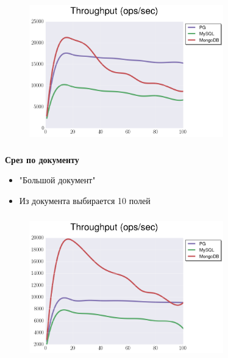 \documentclass[usenames,dvipsnames, 18pt, compress, aspectratio=169]{beamer}
\begin{document}
\begin{frame}
    \frametitle{}
    \begin{center}
    \begin{figure}
        \includegraphics[width=0.75\textwidth,center]{benchmarks/select_slice_1_btree_throughput.png}
    \end{figure}
    \end{center}
\end{frame}

\begin{frame}
    \frametitle{}
    \begin{center}
        \textbf{Срез по документу}
        \begin{itemize}[label={}]
            \item "Большой документ"
            \item Из документа выбирается 10 полей
        \end{itemize}
    \end{center}
\end{frame}

\begin{frame}
    \frametitle{}
    \begin{center}
    \begin{figure}
        \includegraphics[width=0.75\textwidth,center]{benchmarks/select_slice_10_btree_throughput.png}
    \end{figure}
    \end{center}
\end{frame}
\end{document}
